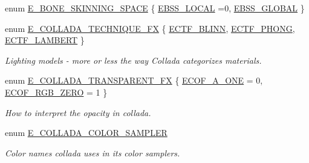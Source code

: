 \begin{DoxyCompactItemize}
\item 
enum \hyperlink{namespaceirr_1_1scene_a47bfc785c34c953f926c920cd13ba1fb}{E\+\_\+\+B\+O\+N\+E\+\_\+\+S\+K\+I\+N\+N\+I\+N\+G\+\_\+\+S\+P\+A\+CE} \{ \hyperlink{namespaceirr_1_1scene_a47bfc785c34c953f926c920cd13ba1fba024fe7bb628e922486989ca66e294811}{E\+B\+S\+S\+\_\+\+L\+O\+C\+AL} =0, 
\hyperlink{namespaceirr_1_1scene_a47bfc785c34c953f926c920cd13ba1fbad73d241e222b6402d5e2064625d4823b}{E\+B\+S\+S\+\_\+\+G\+L\+O\+B\+AL}
 \}
\item 
enum \hyperlink{namespaceirr_1_1scene_a9ec31e84e05295892488296b0741e2b1}{E\+\_\+\+C\+O\+L\+L\+A\+D\+A\+\_\+\+T\+E\+C\+H\+N\+I\+Q\+U\+E\+\_\+\+FX} \{ \hyperlink{namespaceirr_1_1scene_a9ec31e84e05295892488296b0741e2b1a69a2ffe63b7956eaedd3862f25d94d51}{E\+C\+T\+F\+\_\+\+B\+L\+I\+NN}, 
\hyperlink{namespaceirr_1_1scene_a9ec31e84e05295892488296b0741e2b1a48c8725416499c9909726e14f18c3fce}{E\+C\+T\+F\+\_\+\+P\+H\+O\+NG}, 
\hyperlink{namespaceirr_1_1scene_a9ec31e84e05295892488296b0741e2b1aef79736ffe4a0d7653644c7082061726}{E\+C\+T\+F\+\_\+\+L\+A\+M\+B\+E\+RT}
 \}\begin{DoxyCompactList}\small\item\em Lighting models -\/ more or less the way Collada categorizes materials. \end{DoxyCompactList}
\item 
enum \hyperlink{namespaceirr_1_1scene_af7dadd5b96b683cfe1800f343c4f6619}{E\+\_\+\+C\+O\+L\+L\+A\+D\+A\+\_\+\+T\+R\+A\+N\+S\+P\+A\+R\+E\+N\+T\+\_\+\+FX} \{ \hyperlink{namespaceirr_1_1scene_af7dadd5b96b683cfe1800f343c4f6619a93b8dbd819a9860581193a60ed6155c6}{E\+C\+O\+F\+\_\+\+A\+\_\+\+O\+NE} = 0, 
\hyperlink{namespaceirr_1_1scene_af7dadd5b96b683cfe1800f343c4f6619aeeb0b34217f227d32be4876aeeaaf70f}{E\+C\+O\+F\+\_\+\+R\+G\+B\+\_\+\+Z\+E\+RO} = 1
 \}\begin{DoxyCompactList}\small\item\em How to interpret the opacity in collada. \end{DoxyCompactList}
\item 
\mbox{\label{namespaceirr_1_1scene_a6204218341c6b449d879cd8367b2f8d8}} 
enum \hyperlink{namespaceirr_1_1scene_a6204218341c6b449d879cd8367b2f8d8}{E\+\_\+\+C\+O\+L\+L\+A\+D\+A\+\_\+\+C\+O\+L\+O\+R\+\_\+\+S\+A\+M\+P\+L\+ER} \begin{DoxyCompactList}\small\item\em Color names collada uses in it\textquotesingle{}s color samplers. \end{DoxyCompactList}

\end{DoxyCompactItemize}

